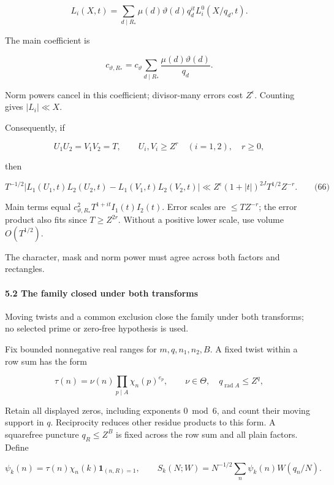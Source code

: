 \[
L_i(X,t)=\sum_{d\mid R_*}\mu(d)\vartheta(d)q_d^{it}L_i^0(X/q_d,t).
\]

The main coefficient is

\[
c_{\vartheta,R_*}=c_\vartheta\sum_{d\mid R_*}\frac{\mu(d)\vartheta(d)}{q_d}.
\]

Norm powers cancel in this coefficient; divisor-many errors cost \(Z^\epsilon\). Counting gives \(|L_i|\ll X\).

Consequently, if

\[
U_1U_2=V_1V_2=T,\qquad U_i,V_i\ge Z^r\quad(i=1,2),\quad r\ge0,
\]

then

\hypertarget{cf:eq:D.2}{}

\label{cf:eq:D.2}

\[
T^{-1/2}\left|L_1(U_1,t)L_2(U_2,t)-L_1(V_1,t)L_2(V_2,t)\right|
\ll Z^\epsilon(1+|t|)^{2J}T^{1/2}Z^{-r}.
\qquad\text{(66)}
\]

Main terms equal \(c_{\vartheta,R_*}^2T^{1+it}I_1(t)I_2(t)\). Error scales are \(\le TZ^{-r}\); the error product also fits since \(T\ge Z^{2r}\). Without a positive lower scale, use volume \(O(T^{1/2})\).

The character, mask and norm power must agree across both factors and rectangles.

\hypertarget{cf:sec:D.2}{}

\label{cf:sec:D.2}

\hypertarget{the-family-closed-under-both-transforms}{%
\paragraph{5.2 The family closed under both transforms}\label{the-family-closed-under-both-transforms}}

Moving twists and a common exclusion close the family under both transforms; no selected prime or zero-free hypothesis is used.

Fix bounded nonnegative real ranges for \(m,q,n_1,n_2,B\). A fixed twist within a row sum has the form

\[
\tau(n)=\nu(n)\prod_{p\mid A}\chi_n(p)^{e_p},\qquad \nu\in\Theta,\quad q_{\operatorname{rad}A}\le Z^q,
\]

Retain all displayed zeros, including exponents \(0\bmod6\), and count their moving support in \(q\). Reciprocity reduces other residue products to this form. A squarefree puncture \(q_R\le Z^B\) is fixed across the row sum and all plain factors. Define

\[
\psi_k(n)=\tau(n)\chi_n(k)\mathbf1_{(n,R)=1},\qquad
S_k(N;W)=N^{-1/2}\sum_n\psi_k(n)W(q_n/N).
\]

